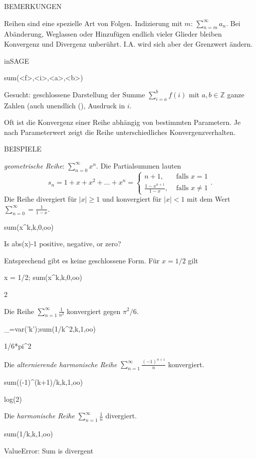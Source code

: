 \documentclass[fontsize=12pt,paper=a4,twoside,bibtotoc,idxtotoc,
liststotoc,pagesize,BCOR1.2cm,DIV15,chapterprefix,pagesize=pdftex]{scrbook}
\theoremstyle{plain}
\theoremstyle{definition}
\theoremstyle{remark}
\begin{document}
BEMERKUNGEN


  Reihen sind eine spezielle Art von Folgen.
 Indizierung mit $m$: $\sum_{n=m}^\infty a_n$.
 Bei Abänderung, Weglassen oder Hinzufügen endlich vieler Glieder
bleiben Konvergenz und Divergenz unberührt. I.A. wird sich aber der
Grenzwert ändern.


inSAGE

\begin{sagein}
sum(<f>,<i>,<a>,<b>) 
\end{sagein}
Gesucht: geschlossene Darstellung der Summe $\sum_{i=a}^b f(i)$ mit $a,b \in \mathbb{Z}$ ganze
Zahlen (auch unendlich (),  Ausdruck in $i$.

 Oft ist die Konvergenz einer Reihe abhängig von bestimmten Parametern. Je nach Parameterwert zeigt die Reihe
unterschiedliches Konvergenzverhalten.


BEISPIELE


 \emph{geometrische Reihe}: $\sum_{n=0}^\infty x^n$. Die
Partialsummen lauten
\[ s_n=1+x+x^2+\ldots + x^n = \left \{ \begin{array}{ll}
n+1, & \mbox{ falls } x=1\\
\frac{1-x^{n+1}}{1-x}, & \mbox{ falls } x \neq 1 
\end{array} \right. .\]
Die Reihe divergiert für $|x|\geq1$ und konvergiert für $|x|<1$ mit
dem Wert $\sum_{n=0}^\infty = \frac{1}{1-x}$.

\begin{sagein}
sum(x^k,k,0,oo)
\end{sagein}
\begin{sage}
Is  abs(x)-1  positive, negative, or zero?
\end{sage}
Entsprechend gibt es keine geschlossene Form. Für $x=1/2$ gilt
\begin{sagein}
x = 1/2; sum(x^k,k,0,oo)
\end{sagein}
\begin{sage}
  2
\end{sage}
 Die Reihe $\sum_{n=1}^\infty \frac{1}{n^2}$ konvergiert gegen
$\pi^2/6$.
\begin{sagein}
_=var('k');sum(1/k^2,k,1,oo)
\end{sagein}
\begin{sage}
1/6*pi^2
\end{sage}
 Die \emph{alternierende harmonische Reihe}  $\sum_{n=1}^\infty
\frac{(-1)^{n+1}}{n}$ konvergiert.
\begin{sagein}
sum((-1)^(k+1)/k,k,1,oo)
\end{sagein}
\begin{sage}
  log(2)
\end{sage}
 Die \emph{harmonische Reihe} $\sum_{n=1}^\infty \frac{1}{n}$
 divergiert.
\begin{sagein}
sum(1/k,k,1,oo)
\end{sagein}
\begin{sage}
ValueError: Sum is divergent
\end{sage}
\end{document}
